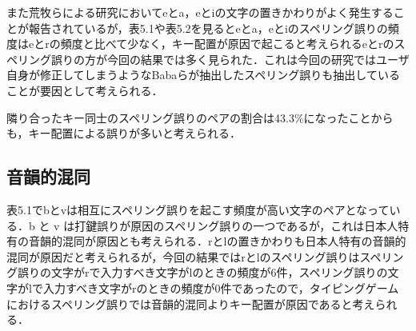 また荒牧らによる研究\cite{aramakiNLP2010}においてeとa，eとiの文字の置きかわりがよく発生することが報告されているが，表5.1や表5.2を見るとeとa，eとiのスペリング誤りの頻度はeとrの頻度と比べて少なく，キー配置が原因で起こると考えられるeとrのスペリング誤りの方が今回の結果では多く見られた．これは今回の研究ではユーザ自身が修正してしまうようなBabaらが抽出したスペリング誤り\cite{babaACL2012}も抽出していることが要因として考えられる．

\begin{comment}
表5.1においてのスペリング誤りの文字と入力すべき文字をスペリング誤りのペアとして抽出し，その中で
\end{comment}
隣り合ったキー同士のスペリング誤りのペアの割合は43.3\%になったことからも，キー配置による誤りが多いと考えられる．

\begin{comment}
\subsubsection{視覚的混同}
文字同士の形が似ていることから視覚的混同を起こすことが原因であると考えられるスペリング誤りを示す．文字同士の形態的類似度は荒牧ら\cite{aramakiNLP2010}が用いた式に基づいて算出した．式は文字をMSゴシックのフォントで表し，2つの文字の面積の和を分母，2つの文字のフォントを重ね合わせたとき，重なり合った部分の面積の2倍の値を分子としている．式は以下に示す．

\[
  \mbox{文字の類似度} = \frac{\mbox{文字同士の重なり合う部分の面積} \times 2}{\mbox{2つの文字の面積の和}}
\]

表5.3にこの式を用いて求めたsやoと他の文字との類似度を示す．表5.1をみるとsがスペリング誤りになるときの入力すべき文字はcであり，これらの文字は表5.3で示される文字の類似度においても高い値を示している．また表5.3にはpとoについての類似度も示しており，pとoの類似度が互いに高い類似度の値を示している．このことからcとs，pとoのスペリング誤りにおいて視覚的混同が理由の一つになると考えられる．

表5.1においてのスペリング誤りの文字と入力すべき文字をスペリング誤りのペアとして抽出し，その中で表5.3の類似度が0.75以上となるスペリング誤りを抽出したところ，その割合は18.2\%となった．
\end{comment}

\subsection{音韻的混同}
表5.1でbとvは相互にスペリング誤りを起こす頻度が高い文字のペアとなっている．b と v は打鍵誤りが原因のスペリング誤りの一つであるが，これは日本人特有の音韻的混同が原因とも考えられる．rとlの置きかわりも日本人特有の音韻的混同が原因だと考えられるが，今回の結果ではrとlのスペリング誤りはスペリング誤りの文字がrで入力すべき文字がlのときの頻度が6件，スペリング誤りの文字がlで入力すべき文字がrのときの頻度が0件であったので，タイピングゲームにおけるスペリング誤りでは音韻的混同よりキー配置が原因であると考えられる．

